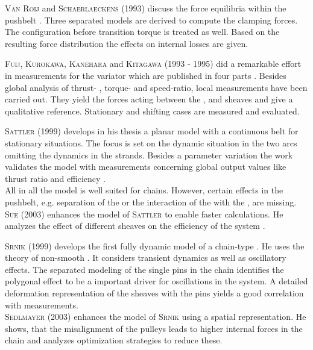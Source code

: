 \textsc{Van Roij} and \textsc{Schaerlaeckens} (1993) discuss the force equilibria within the pushbelt \cite{van_rooij_krafte_1993, van_rooij_krafte_1993-2, van_rooij_krafte_1993-1}.
Three separated models are derived to compute the clamping forces.
The \UD configuration before transition torque is treated as well.
Based on the resulting force distribution the effects on internal losses are given.\par

\textsc{Fuij}, \textsc{Kurokawa}, \textsc{Kanehara} and \textsc{Kitagawa} (1993 - 1995) did a remarkable effort in measurements for the \CVT variator which are published in four parts \cite{fujii_study_1993, fujii_study_1993-1, kanehara_study_1994, kitagawa_study_1995}.
Besides global analysis of thrust- , torque- and speed-ratio, local measurements have been carried out.
They yield the forces acting between the \els, \rings and sheaves and give a qualitative reference.
Stationary and shifting cases are measured and evaluated.\par

\textsc{Sattler} (1999) develops in his thesis a planar \CVT model with a continuous belt for stationary situations.
The focus is set on the dynamic situation in the two arcs omitting the dynamics in the strands. 
Besides a parameter variation the work validates the model with measurements concerning global output values like thrust ratio and efficiency \cite{sattler_stationares_1999}.\\ 
All in all the model is well suited for chains. 
However, certain effects in the pushbelt, e.g. separation of the \els or the interaction of the \els with the \rings, are missing.\\ 
\textsc{Sue} (2003) enhances the model of \textsc{Sattler} to enable faster calculations.
He analyzes the effect of different sheaves on the efficiency of the system \cite{sue_betriebsverhalten_2003}.\par

\textsc{Srnik} (1999) develops the first fully dynamic model of a chain-type \CVT \cite{srnik_dynamik_1999}.
He uses the theory of non-smooth \MBS. 
It considers transient dynamics as well as oscillatory effects.
The separated modeling of the single pins in the chain identifies the polygonal effect to be a important driver for oscillations in the system.
A detailed deformation representation of the sheaves with the pins yields a good correlation with measurements.\\ 
\textsc{Sedlmayer} (2003) enhances the model of \textsc{Srnik} using a spatial representation.
He shows, that the misalignment of the pulleys leads to higher internal forces in the chain and analyzes optimization strategies to reduce these.\par

